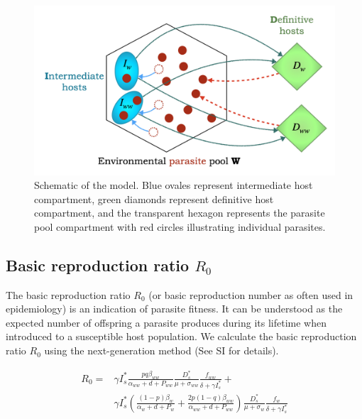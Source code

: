 \documentclass[11pt]{article}
\begin{document}
\begin{figure}[ht!]
\includegraphics[width=\textwidth]{Figures/schematic.jpeg}
\caption{Schematic of the model. Blue ovales represent intermediate host compartment, 
green diamonds represent definitive host compartment, 
and the transparent hexagon represents the parasite pool compartment with red circles illustrating individual parasites.
}
\label{fig:schematic}
\end{figure}

\subsection*{Basic reproduction ratio $R_0$}

The basic reproduction ratio $R_0$ (or basic reproduction number as often used in epidemiology) is an indication of parasite fitness. 
It can be understood as the expected number of offspring a parasite produces during its lifetime when introduced to a susceptible host population. 
We calculate the basic reproduction ratio $R_0$ using the next-generation method \citep{Diekmann1990, Diekmann2009, Hurford2009} (See SI for details).

\begin{align}
R_0 = & \gamma I_s^* \frac{ p q \beta_{ww}}{\alpha_{ww} + d + P_{ww}} \frac{D_s^*}{\mu +\sigma_{ww}} \frac{f_{ww}}{\delta +\gamma I_s^*} + \nonumber \\
& \gamma  I_s^* \left( \frac{ (1-p)\beta_w}{\alpha_w + d + P_w} + \frac{2 p (1-q) \beta_{ww}}{\alpha_{ww} + d + P_{ww}} \right) \frac{D_s^*}{\mu + \sigma_w} \frac{f_w}{\delta +\gamma  I_s^*}
\end{align}
\end{document}
